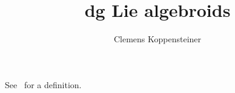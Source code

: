 \documentclass[english,no-theorem-numbers]{short-notes}
\title{dg Lie algebroids}
\author{Clemens Koppensteiner}
\begin{document}
\maketitle

See~\cite{Vezzosi:arXiv:ModelStructureOnRelativeDGLieAlgebroids} for a definition.

\printbibliography
\end{document}
